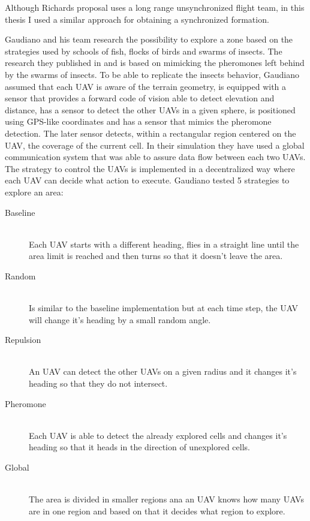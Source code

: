 Although Richards proposal uses a long range unsynchronized flight team, in this
thesis I used a similar approach for obtaining a synchronized formation.

Gaudiano and his team research the possibility to explore a zone based on the 
strategies used by schools of fish, flocks of birds and swarms of insects. 
The research they published in \cite{bugs} and \cite{c2-paradigm} is based on 
mimicking the pheromones left behind by the swarms of insects. To be able to 
replicate the insects behavior, Gaudiano assumed that each UAV is aware of the 
terrain geometry, is equipped with a sensor that provides a forward code of vision
able to detect elevation and distance, has a sensor to detect the other UAVs 
in a given sphere, is positioned using GPS-like coordinates and has a sensor
that mimics the pheromone detection. The later sensor detects, within a rectangular
region centered on the UAV, the coverage of the current cell. In their simulation
they have used a global communication system that was able to assure data flow
between each two UAVs. The strategy to control the UAVs is implemented in a 
decentralized way where each UAV can decide what action to execute. Gaudiano 
tested 5 strategies to explore an area:

\begin{description}
\item[Baseline] \hfill \\ Each UAV starts with a different heading, flies in a straight line
until the area limit is reached and then turns so that it doesn't leave the area.
\item[Random] \hfill \\ Is similar to the baseline implementation but at each time step, 
the UAV will change it's heading by a small random angle.
\item[Repulsion] \hfill \\ An UAV can detect the other UAVs on a given radius and it changes
it's heading so that they do not intersect.
\item[Pheromone] \hfill \\ Each UAV is able to detect the already explored cells and changes it's
heading so that it heads in the direction of unexplored cells.
\item[Global]  \hfill \\ The area is divided in smaller regions ana an UAV knows 
how many UAVs are in one region and based on that it decides what region to explore.
\end{description}

